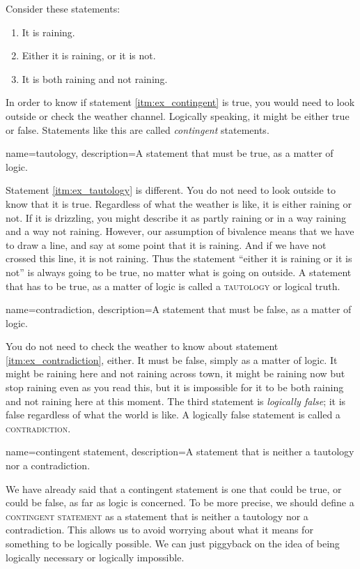 Consider these statements:
\begin{enumerate}[label=(\alph*)]
\item \label{itm:ex_contingent} It is raining.
\item \label{itm:ex_tautology} Either it is raining, or it is not.
\item \label{itm:ex_contradiction} It is both raining and not raining.
\end{enumerate}
In order to know if statement \ref{itm:ex_contingent} is true, you would need to look outside or check the weather channel. Logically speaking, it might be either true or false. Statements like this are called \emph{contingent} statements.


{
name=tautology,
description={A statement that must be true, as a matter of logic.}
}

Statement \ref{itm:ex_tautology} is different. You do not need to look outside to know that it is true. Regardless of what the weather is like, it is either raining or not. If it is drizzling, you might describe it as partly raining or in a way raining and a way not raining. However, our assumption of bivalence means that we have to draw a line, and say at some point that it is raining. And if we have not crossed this line, it is not raining. Thus the statement ``either it is raining or it is not'' is always going to be true, no matter what is going on outside. A statement that has to be true, as a matter of logic is called a \textsc{\gls{tautology}} \label{def:tautology} or logical truth. 

{
name=contradiction,
description={A statement that must be false, as a matter of logic.}
}

You do not need to check the weather to know about statement \ref{itm:ex_contradiction}, either. It must be false, simply as a matter of logic. It might be raining here and not raining across town, it might be raining now but stop raining even as you read this, but it is impossible for it to be both raining and not raining here at this moment. The third statement is \emph{logically false}; it is false regardless of what the world is like. A logically false statement is called a \textsc{\gls{contradiction}}. \label{def:contradiction}

{
name=contingent statement,
description={A statement that is neither a tautology nor a contradiction.}
}

We have already said that a contingent statement is one that could be true, or could be false, as far as logic is concerned. To be more precise, we should define a \textsc{\gls{contingent statement}}  \label{def:contingent_statement} as a statement that is neither a tautology nor a contradiction. This allows us to avoid worrying about what it means for something to be logically possible. We can just piggyback on the idea of being logically necessary or logically impossible. 

